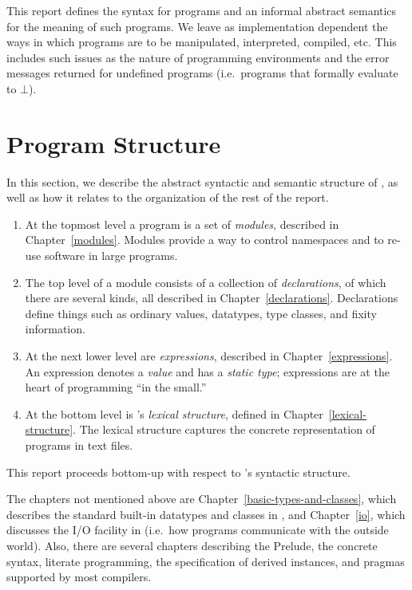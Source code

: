 This report defines the syntax for \Haskell{} programs and an
informal abstract semantics for the meaning of such
programs.
We leave as implementation
dependent the ways in which \Haskell{} programs are to be
manipulated, interpreted, compiled, etc.  This includes such issues as
the nature of programming environments and
the error messages returned for undefined programs
(i.e.~programs that formally evaluate to $\bot$).

\section{Program Structure}
\label{programs}

In this section, we describe the abstract syntactic and semantic structure of
\Haskell{}, as well as how it relates to the organization of the
rest of the report.
\begin{enumerate}
\item At the topmost level a \Haskell{} program is a set
of {\em modules}, described in Chapter~\ref{modules}.  Modules provide
a way to control namespaces
and to re-use software in large programs.

\item The top level of a module consists of a collection of
{\em declarations}, of which there are several kinds, all described
in Chapter~\ref{declarations}.  Declarations
define things such as ordinary values, datatypes, type
classes, and fixity information.

\item At the next lower level are {\em expressions}, described
in Chapter~\ref{expressions}.  An expression denotes a {\em value}
and has a {\em static type}; expressions are at the heart of
\Haskell{} programming ``in the small.''

\item At the bottom level is \Haskell{}'s {\em
lexical structure}, defined in Chapter~\ref{lexical-structure}.  The
lexical structure captures the concrete
representation of \Haskell{} programs in text files.

\end{enumerate}
This report proceeds bottom-up with respect
to \Haskell{}'s syntactic structure.

The chapters not mentioned above are
Chapter~\ref{basic-types-and-classes}, which
describes the standard built-in datatypes and classes in \Haskell{}, and
Chapter~\ref{io}, which discusses the I/O facility in \Haskell{}
(i.e.~how \Haskell{} programs communicate with the outside world).
Also, there are several chapters describing the Prelude,
the concrete syntax, literate programming, the specification of derived
instances, and pragmas supported by most \Haskell{} compilers.

